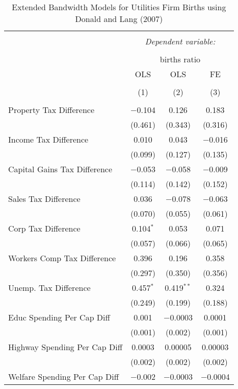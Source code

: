 
\begin{table}[!htbp] \centering 
  \caption{Extended Bandwidth Models for  Utilities Firm Births using Donald and Lang (2007)} 
  \label{} 
\begin{tabular}{@{\extracolsep{5pt}}lccc} 
\\[-1.8ex]\hline 
\hline \\[-1.8ex] 
 & \multicolumn{3}{c}{\textit{Dependent variable:}} \\ 
\cline{2-4} 
\\[-1.8ex] & \multicolumn{3}{c}{births ratio} \\ 
 & OLS & OLS & FE \\ 
\\[-1.8ex] & (1) & (2) & (3)\\ 
\hline \\[-1.8ex] 
 Property Tax Difference & $-$0.104 & 0.126 & 0.183 \\ 
  & (0.461) & (0.343) & (0.316) \\ 
  Income Tax Difference & 0.010 & 0.043 & $-$0.016 \\ 
  & (0.099) & (0.127) & (0.135) \\ 
  Capital Gains Tax Difference & $-$0.053 & $-$0.058 & $-$0.009 \\ 
  & (0.114) & (0.142) & (0.152) \\ 
  Sales Tax Difference & 0.036 & $-$0.078 & $-$0.063 \\ 
  & (0.070) & (0.055) & (0.061) \\ 
  Corp Tax Difference & 0.104$^{*}$ & 0.053 & 0.071 \\ 
  & (0.057) & (0.066) & (0.065) \\ 
  Workers Comp Tax Difference & 0.396 & 0.196 & 0.358 \\ 
  & (0.297) & (0.350) & (0.356) \\ 
  Unemp. Tax Difference & 0.457$^{*}$ & 0.419$^{**}$ & 0.324 \\ 
  & (0.249) & (0.199) & (0.188) \\ 
  Educ Spending Per Cap Diff & 0.001 & $-$0.0003 & 0.0001 \\ 
  & (0.001) & (0.002) & (0.001) \\ 
  Highway Spending Per Cap Diff & 0.0003 & 0.00005 & 0.00003 \\ 
  & (0.002) & (0.002) & (0.002) \\ 
  Welfare Spending Per Cap Diff & $-$0.002 & $-$0.0003 & $-$0.0004 \\ 

\end{tabular}
\end{table}
